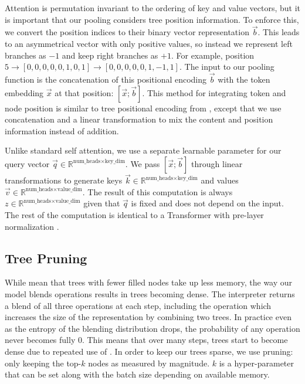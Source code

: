 Attention is permutation invariant to the ordering of key and value vectors, but it is important that our pooling considers tree position information. To enforce this, we convert the position indices to their binary vector representation $\vec{b}$. This leads to an asymmetrical vector with only positive values, so instead we represent left branches as $-1$ and keep right branches as $+1$. For example, position $5 \rightarrow [0,0,0,0,0,1,0,1] \rightarrow [0,0,0,0,0,1,-1,1]$. The input to our pooling function is the concatenation of this positional encoding $\vec{b}$ with the token embedding $\vec{x}$ at that position: $[\vec{x};\vec{b}]$. This method for integrating token and node position is similar to tree positional encoding from \citet{NEURIPS2019_6e091746}, except that we use concatenation and a linear transformation to mix the content and position information instead of addition.

Unlike standard self attention, we use a separate learnable parameter for our query vector $\vec{q} \in \mathbb{R}^{\text{num\_heads}\times\text{key\_dim}}$. We pass $[\vec{x};\vec{b}]$ through linear transformations to generate keys $\vec{k} \in \mathbb{R}^{\text{num\_heads}\times\text{key\_dim}}$ and values $\vec{v} \in \mathbb{R}^{\text{num\_heads}\times\text{value\_dim}}$. The result of this computation is always $z \in \mathbb{R}^{\text{num\_heads}\times\text{value\_dim}}$ given that $\vec{q}$ is fixed and does not depend on the input. The rest of the computation is identical to a Transformer with pre-layer normalization \citep{xiong2020layer}.

\subsection{Tree Pruning} \label{sec:sdtm-pruning}
While \fullrepname mean that trees with fewer filled nodes take up less memory, the way our model blends operations results in trees becoming dense.
The interpreter returns a blend of all three operations at each step, including the \cons operation which increases the size of the representation by combining two trees. In practice even as the entropy of the blending distribution drops, the probability of any operation never becomes fully 0. This means that over many steps, trees start to become dense due to repeated use of \cons. In order to keep our trees sparse, we use pruning: only keeping the top-$k$ nodes as measured by magnitude. $k$ is a hyper-parameter that can be set along with the batch size depending on available memory. 

